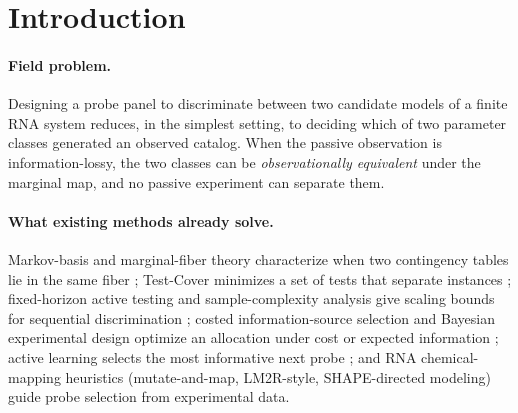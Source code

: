 \documentclass[11pt]{article}
\begin{document}
\begin{abstract}
\texttt{DESCRIPTIVE\_ONLY} model-sensitivity illustrations: the same model-conditional certificate
computation is executed on a registered finite observation model built from the published normalized
reactivity (the add riboswitch 1M7 SHAPE, the gcvT glycine riboswitch DMS, and the miniTTR
Mg$^{2+}$-dependent DMS switch), showing the registration slots apply across these inputs and not
claiming cross-system generalization, external validation, or real-data confirmation. The remaining
retrospective records (SAM-III, RORC) stay fail-closed, and an executed negative control on the
registered add model confirms the executable is fail-closed. The
contribution is a certified
design method whose scope is bounded by the registered finite model.
\end{abstract}

\section{Introduction}\label{sec:intro}
\paragraph{Field problem.}
Designing a probe panel to discriminate between two candidate models of a finite RNA system reduces,
in the simplest setting, to deciding which of two parameter classes generated an observed catalog. When
the passive observation is information-lossy, the two classes can be \emph{observationally equivalent}
under the marginal map, and no passive experiment can separate them.

\paragraph{What existing methods already solve.}
Markov-basis and marginal-fiber theory characterize when two contingency tables lie in the same fiber
\citep{diaconis1998markov,deloera1995grobner}; Test-Cover minimizes a set of tests that separate
instances \citep{moret1991test}; fixed-horizon active testing and sample-complexity analysis give
scaling bounds for sequential discrimination \citep{chernoff1959sequential,hoeffding1963probability};
costed information-source selection and Bayesian experimental design optimize an allocation under cost
or expected information \citep{pukelsheim2006optimal,lindley1956information,chaloner1995bayesian};
active learning selects the most informative next probe \citep{cohn1996active}; and RNA
chemical-mapping heuristics (mutate-and-map, LM2R-style, SHAPE-directed modeling)
\citep{kladwang2011mutate,cordero2012importance,cheng2015consistent,hajdin2013shapeknots} guide probe
selection from experimental data.
\end{document}
